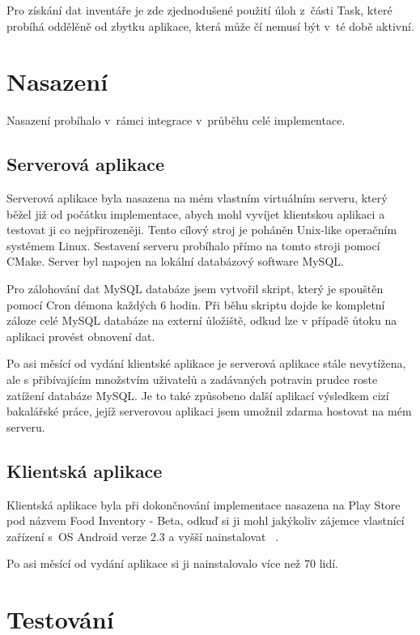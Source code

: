 \documentclass[thesis=B,czech]{FITthesis}[2013/10/20]
\begin{document}
Pro získání dat inventáře je zde zjednodušené použití úloh z~části Task, které probíhá oddělěně od zbytku aplikace, která může čí nemusí být v~té době aktivní.

\chapter{Nasazení}

Nasazení probíhalo v~rámci integrace v~průběhu celé implementace.

\section{Serverová aplikace}

Serverová aplikace byla nasazena na mém vlastním virtuálním serveru, který běžel již od počátku implementace, abych mohl vyvíjet klientskou aplikaci a testovat ji co nejpřirozeněji. Tento cílový stroj je poháněn Unix-like operačním systémem Linux. Sestavení serveru probíhalo přímo na tomto stroji pomocí CMake. Server byl napojen na lokální databázový software MySQL. 

Pro zálohování dat MySQL databáze jsem vytvořil skript, který je spouštěn pomocí Cron démona každých 6 hodin. Při běhu skriptu dojde ke kompletní záloze celé MySQL databáze na externí ůložiště, odkud lze v případě ůtoku na aplikaci provést obnovení dat.

Po asi měsící od vydání klientské aplikace je serverová aplikace stále nevytížena, ale s přibívajícím množstvím uživatelů a zadávaných potravin prudce roste zatížení databáze MySQL. Je to také způsobeno další aplikací výsledkem cizí bakalářské práce, jejíž serverovou aplikaci jsem umožnil zdarma hostovat na mém serveru.

\section{Klientská aplikace}

Klientská aplikace byla při dokončnování implementace nasazena na Play Store pod názvem Food Inventory - Beta, odkuď si ji mohl jakýkoliv zájemce vlastnící zařízení s~OS Android verze 2.3 a vyšší nainstalovat ~\cite{food_inventory_playstore}.

Po asi měsící od vydání aplikace si ji nainstalovalo více než 70 lidí.

\chapter{Testování}
\end{document}

